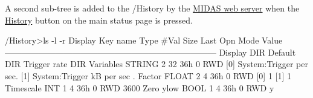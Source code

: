 A second sub-\/tree is added to the /History by the \hyperlink{RC_mhttpd_utility}{MIDAS web server} when the \hyperlink{RC_mhttpd_History_page}{History} button on the main status page is pressed.


\begin{DoxyCode}
/History>ls -l -r Display
Key name                        Type    #Val  Size  Last Opn Mode Value
---------------------------------------------------------------------------
Display                         DIR
  Default                       DIR
    Trigger rate                DIR
        Variables               STRING  2     32    36h  0   RWD
                                        [0]             System:Trigger per sec.
                                        [1]             System:Trigger kB per sec
      .
        Factor                  FLOAT   2     4     36h  0   RWD
                                        [0]             1
                                        [1]             1
        Timescale               INT     1     4     36h  0   RWD  3600
        Zero ylow               BOOL    1     4     36h  0   RWD  y
\end{DoxyCode}


